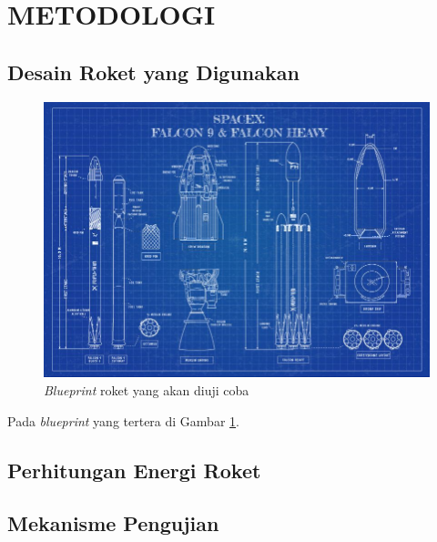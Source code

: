 \section{METODOLOGI}


\subsection{Desain Roket yang Digunakan}

\lipsum[11]

\begin{figure} [ht] \centering
  \includegraphics[scale=0.45]{gambar/blueprint.jpg}
  \caption{\emph{Blueprint} roket yang akan diuji coba \citep{SpaceXBlueprint}}
  \label{fig:Blueprint}
\end{figure}

Pada \emph{blueprint} yang tertera di Gambar \ref{fig:Blueprint}. \lipsum[12]

\subsection{Perhitungan Energi Roket}

\lipsum[13]

\subsection{Mekanisme Pengujian}

\lipsum[14]
